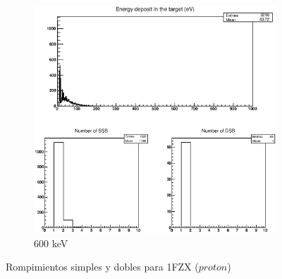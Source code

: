 \begin{figure}
\begin{subfigure}{.5\textwidth}
  \includegraphics[width=.78\linewidth]{./Figures/1fzxp600kev.eps}
  \caption{600 keV}
  \label{fig:subi8}
\end{subfigure}
\caption{Rompimientos simples y dobles para 1FZX ($proton$)}
\label{fig:p2}
\end{figure}




